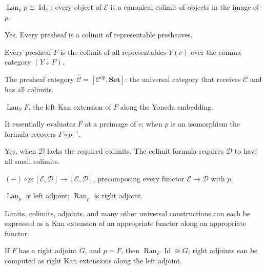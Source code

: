 \begin{exercisesbox}
\begin{qa}
       {$\operatorname{Lan}_p p \cong \operatorname{Id}_{\mathcal{E}}$; every object
        of $\mathcal{E}$ is a canonical colimit of objects in the image of $p$.}

       {Yes. Every presheaf is a colimit of representable presheaves.}

       {Every presheaf $F$ is the colimit of all representables $Y(c)$ over
        the comma category $(Y \downarrow F)$.}

       {The presheaf category $\hat{\mathcal{C}} = [\mathcal{C}^{op}, \mathbf{Set}]$:
        the universal category that receives $\mathcal{C}$ and has all colimits.}

       {$\operatorname{Lan}_Y F$, the left Kan extension of $F$ along the Yoneda embedding.}

       {It essentially evaluates $F$ at a preimage of $e$; when $p$ is an
        isomorphism the formula recovers $F \circ p^{-1}$.}

       {Yes, when $\mathcal{D}$ lacks the required colimits. The colimit formula
        requires $\mathcal{D}$ to have all small colimits.}

       {$(-) \circ p : [\mathcal{E}, \mathcal{D}] \to [\mathcal{C}, \mathcal{D}]$,
        precomposing every functor $\mathcal{E} \to \mathcal{D}$ with $p$.}

       {$\operatorname{Lan}_p$ is left adjoint; $\operatorname{Ran}_p$ is right adjoint.}

       {Limits, colimits, adjoints, and many other universal constructions can each
        be expressed as a Kan extension of an appropriate functor along an appropriate
        functor.}

       {If $F$ has a right adjoint $G$, and $p = F$, then $\operatorname{Ran}_F \operatorname{Id}
        \cong G$; right adjoints can be computed as right Kan extensions along the
        left adjoint.}


\end{qa}
\end{exercisesbox}
